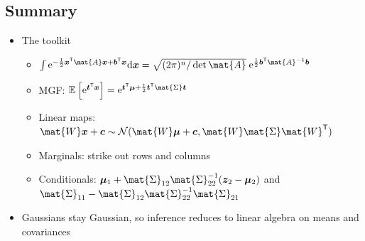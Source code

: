\begin{slide}
\section{Summary}

\begin{PauseHighLight}
  \begin{itemize}
  \item The toolkit
    \begin{itemize}
    \item $\int\e{-\frac12\bm{x}^\tr\mat{A}\bm{x}+\bm{b}^\tr\bm{x}}\dd\bm{x}
      = \sqrt{(2\pi)^n/\det\mat{A}}\;\e{\frac12\bm{b}^\tr\mat{A}^{-1}\bm{b}}$\pause
    \item MGF: $\av{\e{\bm{t}^\tr\bm{x}}} =
      \e{\bm{t}^\tr\bm{\mu}+\frac12\bm{t}^\tr\mat{\Sigma}\bm{t}}$\pause
    \item Linear maps: $\mat{W}\bm{x}+\bm{c}\sim
      \mathcal{N}(\mat{W}\bm{\mu}+\bm{c},\mat{W}\mat{\Sigma}\mat{W}^\tr)$\pause
    \item Marginals: strike out rows and columns\pause
    \item Conditionals: $\bm{\mu}_1 +
      \mat{\Sigma}_{12}\mat{\Sigma}_{22}^{-1}(\bm{z}_2-\bm{\mu}_2)$ and
      $\mat{\Sigma}_{11}-\mat{\Sigma}_{12}\mat{\Sigma}_{22}^{-1}\mat{\Sigma}_{21}$\pause
    \end{itemize}
  \item Gaussians stay Gaussian, so inference reduces to linear
    algebra on means and covariances\pause
  \end{itemize}
\end{PauseHighLight}

\end{slide}


